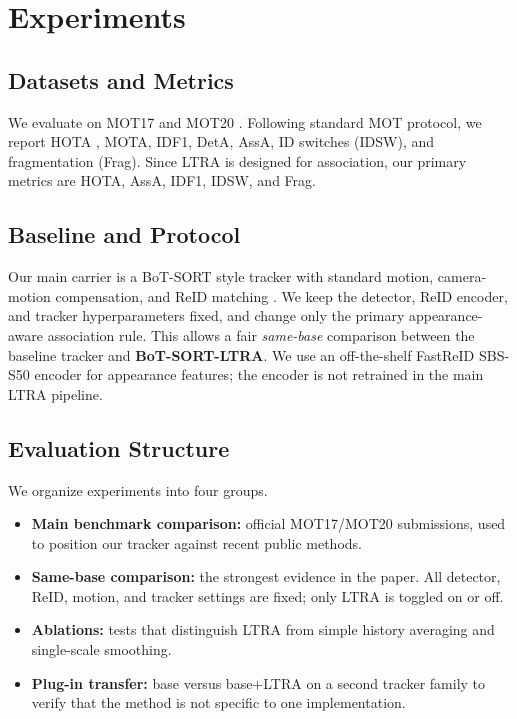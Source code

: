 \section{Experiments}
\subsection{Datasets and Metrics}
We evaluate on MOT17 \cite{milan2016mot16} and MOT20 \cite{dendorfer2020mot20}. Following standard MOT protocol, we report HOTA \cite{luiten2020hota}, MOTA, IDF1, DetA, AssA, ID switches (IDSW), and fragmentation (Frag). Since LTRA is designed for association, our primary metrics are HOTA, AssA, IDF1, IDSW, and Frag.

\subsection{Baseline and Protocol}
Our main carrier is a BoT-SORT style tracker with standard motion, camera-motion compensation, and ReID matching \cite{aharon2022botsort}. We keep the detector, ReID encoder, and tracker hyperparameters fixed, and change only the primary appearance-aware association rule. This allows a fair \emph{same-base} comparison between the baseline tracker and \textbf{BoT-SORT-LTRA}. We use an off-the-shelf FastReID SBS-S50 encoder for appearance features; the encoder is not retrained in the main LTRA pipeline.

\subsection{Evaluation Structure}
We organize experiments into four groups.
\begin{itemize}
  \item \textbf{Main benchmark comparison:} official MOT17/MOT20 submissions, used to position our tracker against recent public methods.
  \item \textbf{Same-base comparison:} the strongest evidence in the paper. All detector, ReID, motion, and tracker settings are fixed; only LTRA is toggled on or off.
  \item \textbf{Ablations:} tests that distinguish LTRA from simple history averaging and single-scale smoothing.
  \item \textbf{Plug-in transfer:} base versus base+LTRA on a second tracker family to verify that the method is not specific to one implementation.
\end{itemize}

